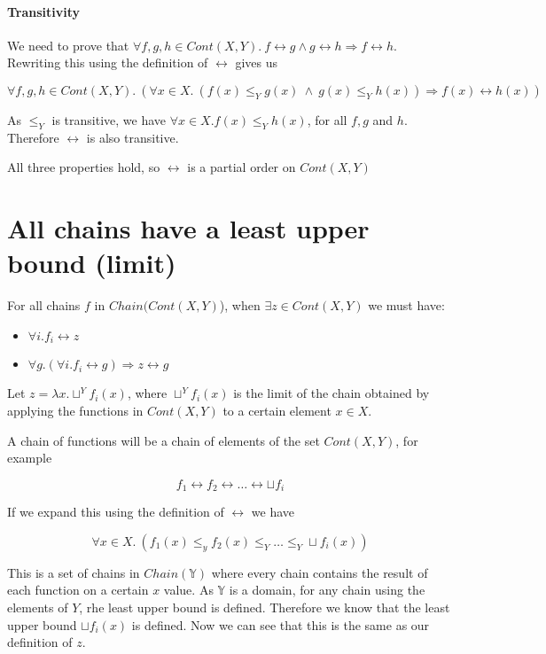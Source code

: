 \paragraph{Transitivity}
We need to prove that $\forall f,g,h \in Cont(X,Y). \ f \rel g \wedge g \rel h \Rightarrow f \rel h$. Rewriting this using the definition of $\rel$ gives us 

\[\forall f,g,h \in Cont(X,Y). \ (\forall x \in X. \ (f(x) \leq_Y g(x) \ \wedge \ g(x) \leq_Y h(x)) \Rightarrow f(x) \rel h(x)) \]
 
As $\leq_Y$ is transitive, we have $\forall x \in X.f(x) \leq_Y h(x)$, for all $f, g$ and $h$. Therefore $\rel$ is also transitive. 

\vspace{0.7cm}

All three properties hold, so $\rel$ is a partial order on $Cont(X,Y)$

\section{All chains have a least upper bound (limit)}

For all chains $f$ in $Chain (Cont(X,Y)$), when $\exists z  \in Cont(X,Y)$ we must have:

\begin{itemize}
\item{$\forall i . f_i \rel z$}
\item{$\forall g. (\forall i . f_i \rel g) \Rightarrow z \rel g$}
\end{itemize}

Let $z = \lambda x. \sqcup^Y f_i (x)$, where $\sqcup^Y f_i (x)$ is the limit of the chain obtained by applying the functions in $Cont(X,Y)$ to a certain element $x \in X$.

A chain of functions will be a chain of elements of the set $Cont(X,Y)$, for example 

\[ f_1 \rel f_2 \rel \dots \rel \sqcup f_i \]

If we expand this using the definition of $\rel$ we have

\[ \forall x \in X. \ (f_1(x) \leq_y f_2(x) \leq_Y \dots \leq_Y \sqcup f_i (x)) \]

This is a set of chains in $Chain(\mathbb{Y})$ where every chain contains the result of each function on a certain $x$ value. As $\mathbb{Y}$ is a domain, for any chain using the elements of $Y$, rhe least upper bound is defined. Therefore we know that the least upper bound $\sqcup f_i (x)$ is defined. Now we can see that this is the same as our definition of $z$. 


